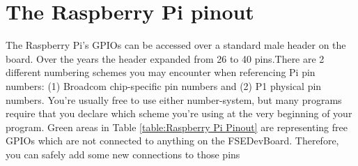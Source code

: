\documentclass[
10pt, %
a4paper, %
oneside, %
headinclude,footinclude, %
BCOR=5mm, %
table,
]{scrartcl}
\begin{document}
\section{The Raspberry Pi pinout}
The Raspberry Pi's GPIOs can be accessed over a standard male header on the board. Over the years the header expanded from 26 to 40 pins.There are 2 different numbering schemes you may encounter when referencing Pi pin numbers: (1) Broadcom chip-specific pin numbers and (2) P1 physical pin numbers. You’re usually free to use either number-system, but many programs require that you declare which scheme you’re using at the very beginning of your program. 
Green areas in Table \ref{table:Raspberry Pi Pinout} are representing free GPIOs which are not connected to anything on the FSEDevBoard. Therefore, you can safely add some new connections to those pins
\end{document}
